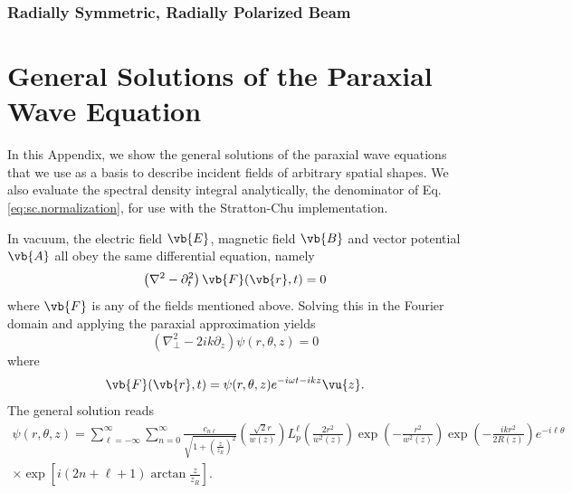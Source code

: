 \documentclass[11pt,SymmetricalJury]{inrsthesis/inrsthesis}
\begin{document}

\subsection{Radially Symmetric, Radially Polarized Beam}

\chapter{General Solutions of the Paraxial Wave Equation}
\label{app:solution-paraxial-equation}

In this Appendix, we show the general solutions of the paraxial wave equations
that we use as a basis to describe incident fields of arbitrary spatial shapes.
We also evaluate the spectral density integral analytically, the denominator of
Eq.\eqref{eq:sc.normalization}, for use with the Stratton-Chu implementation.

In vacuum, the electric field $\vb{E}$, magnetic field $\vb{B}$ and vector
potential $\vb{A}$ all obey the same differential equation, namely
  \begin{equation}
    \left(\nabla^2-\partial_t^2\right)\vb{F}(\vb{r},t) = 0
  \end{equation}
where $\vb{F}$ is any of the fields mentioned above. Solving this
in the Fourier domain and applying the paraxial approximation
yields
  \begin{equation}
    \left(\nabla_\perp^2-2ik\partial_z\right)\psi(r,\theta,z) = 0
  \end{equation}
where
  \begin{equation}
    \vb{F}(\vb{r},t) = \psi(r,\theta,z)e^{-i\omega t - ikz} \vu{z}.
  \end{equation}
The general solution reads \cite{Allen1992}
  \begin{multline}
    \psi(r,\theta,z) = \sum_{\ell=-\infty}^\infty\sum_{n=0}^\infty
      \frac{c_{n\ell}}{\sqrt{1+\left(\frac{z}{z_R}\right)^2}}
      \left(\frac{\sqrt{2}r}{w(z)}\right)
      L_p^\ell\left(\frac{2r^2}{w^2(z)}\right)\exp\left(-\frac{r^2}{w^2(z)}\right)
      \exp\left(-\frac{ikr^2}{2R(z)}\right)e^{-i\ell\theta}\\
      \times\exp\left[i\left(2n+\ell+1\right)\arctan\frac{z}{z_R}\right].
  \end{multline}
\end{document}
